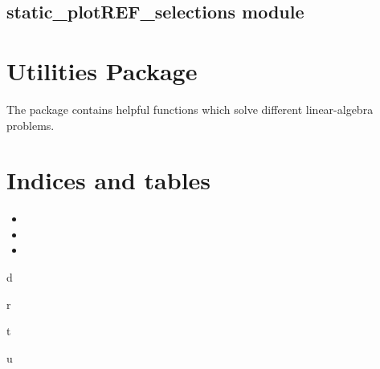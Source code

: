 \documentclass[letterpaper,10pt,english]{sphinxmanual}
\begin{document}
\section{static\_plotREF\_selections module}
\label{\detokenize{radarplots:static-plotref-selections-module}}

\begin{fulllineitems}
\label{\detokenize{radarplots:radar_plots.static_plotREF_selections}}
\end{fulllineitems}



\chapter{Utilities Package}
\label{\detokenize{utils::doc}}\label{\detokenize{utils:utilities-package}}
The package contains helpful functions which solve different linear-algebra problems.
\label{\detokenize{utils:module-utils}}

\chapter{Indices and tables}
\label{\detokenize{index:indices-and-tables}}\begin{itemize}
\item {} 

\item {} 

\item {} 

\end{itemize}


\renewcommand{\indexname}{Python Module Index}
\begin{sphinxtheindex}
\def\bigletter#1{{\Large\sffamily#1}\nopagebreak\vspace{1mm}}
\bigletter{d}
\item {}
\indexspace
\bigletter{r}
\item {}
\indexspace
\bigletter{t}
\item {}
\item {}
\indexspace
\bigletter{u}
\item {}
\end{sphinxtheindex}

\renewcommand{\indexname}{Index}
\printindex
\end{document}
